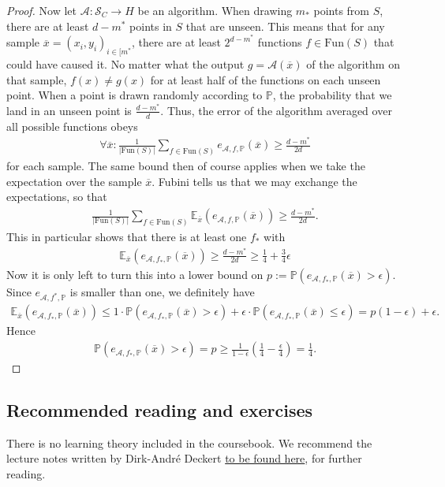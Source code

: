\documentclass{article}
\newcommand{\erw}{\mathbb{E}} %
\newcommand{\calA}{\mathcal{A}}
\newcommand{\calS}{\mathcal{S}}
\renewcommand{\P}{\mathbb{P}}
\newcommand{\abs}[1]{\vert #1 \vert}
\begin{document}
\begin{proof}
    Now let $\calA: \calS_C \to H$ be an algorithm. When drawing $m_*$ points from $S$, there are at least $d-m^*$ points in $S$ that are unseen. This means that for any sample $\overline{x}=(x_i,y_i)_{i \in [m^*}$, there are at least $2^{d-m^*}$ functions $f\in \mathrm{Fun}(S)$ that could have caused it. No matter what the output $g=\calA(\overline{x})$ of the algorithm on that sample,  $f(x)\neq g(x)$ for at least half of the functions on each unseen point. When a point is drawn randomly according to $\mathbb{P}$, the probability that we land in an unseen point is $\frac{d-m^*}{d}$. Thus, the error of the algorithm averaged over all possible functions obeys
    \begin{align*}
       \forall \overline{x} :  \frac{1}{\abs{\mathrm{Fun}(S)}} \sum_{f \in \mathrm{Fun}(S)} e_{\calA,f,\P}(\overline{x}) \geq \frac{d-m^*}{2d}
    \end{align*}
    for each sample. The same bound then of course applies when we take the expectation over the sample $\overline{x}$. Fubini tells us that we may exchange the expectations, so that 
    \begin{align*}
        \frac{1}{\abs{\mathrm{Fun}(S)}} \sum_{f \in \mathrm{Fun}(S)} \erw_{\overline{x}}(e_{\calA,f,\P}(\overline{x})) \geq \frac{d-m^*}{2d}.
    \end{align*}
    This in particular shows that there is at least one $f_*$ with
    \begin{align*}
        \erw_{\overline{x}}(e_{\calA,f_*,\P}(\overline{x})) \geq \frac{d-m^*}{2d} \geq \frac{1}{4}+ \frac{3}{4}\epsilon
    \end{align*}
    Now it is only left to turn this into a lower bound on $p:=\mathbb{P}(e_{\calA,f_*,\mathbb{P}}(\overline{x})>\epsilon)$. Since $e_{\calA,f^*,\mathbb{P}}$ is smaller than one, we definitely have
    \begin{align*}
        \erw_{\overline{x}}(e_{\calA,f_*,\P}(\overline{x})) \leq 1 \cdot \mathbb{P}(e_{\calA,f_*,\P}(\overline{x})>\epsilon) + \epsilon \cdot \mathbb{P}(e_{\calA,f_*,\P}(\overline{x})\leq \epsilon) = p(1-\epsilon)+ \epsilon.
    \end{align*}
    Hence
    \begin{align*}
        \mathbb{P}(e_{\calA,f_*,\P}(\overline{x})>\epsilon) = p \geq \frac{1}{1-\epsilon}\left(\frac{1}{4}- \frac{\epsilon}{4}\right) = \frac{1}{4}.
    \end{align*}
\end{proof}

\subsection{Recommended reading and exercises}
There is no learning theory included in the coursebook. We recommend the lecture notes written by Dirk-André Deckert \cite{dirk2017lecture}
\href{https://www.mathematik.uni-muenchen.de/~deckert/teaching/SS17/ATML/media/VC_dimension.pdf}{to be found here}, for further reading. 
\end{document}
